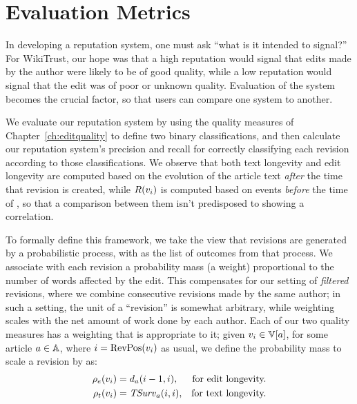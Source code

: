 \section{Evaluation Metrics}
\label{sec:rep-eval}

In developing a reputation system, one must ask
``what is it intended to signal?''
For WikiTrust, our hope was that a high reputation
would signal that edits made by the author were likely
to be of good quality, while a low reputation would
signal that the edit was of poor or unknown quality.
Evaluation of the system becomes the crucial
factor, so that users can compare one system to another.

We evaluate our reputation system by using the quality
measures of Chapter~\ref{ch:editquality} to define two
binary classifications, and then calculate
our reputation system's precision and recall for correctly
classifying each revision according to those classifications.
We observe that both text longevity and edit longevity
are computed based on the
evolution of the article text \textit{after} the time that
revision  is created, while $R(v_{i})$ is
computed based on events \textit{before} the time of ,
so that a comparison between them isn't predisposed to showing
a correlation.

To formally define this framework, we take the view that revisions
are generated by a probabilistic process, with \versions{} as
the list of outcomes from that process.
We associate with each revision a probability mass (a weight)
proportional to the number of words affected by the edit.
This compensates for our setting of \textit{filtered} revisions,
where we combine consecutive revisions made by the same author;
in such a setting, the unit of a ``revision'' is somewhat arbitrary,
while weighting scales with the net amount of work done by each author.
Each of our two quality measures has a weighting that is appropriate
to it; given $\version{i} \in \versions{a}$, for some
article $a \in \mathbb{A}$, where $i = \mathrm{RevPos}(v_{i})$ as usual,
we define the probability mass to scale a revision by as:
\begin{align*}
\rho_e(v_{i}) & = d_{a}(i-1,i), & \text{for edit longevity.} \\
\rho_t(v_{i}) & = \mathit{TSurv}_{a}(i,i), & \text{for text longevity.} \\
\end{align*}

